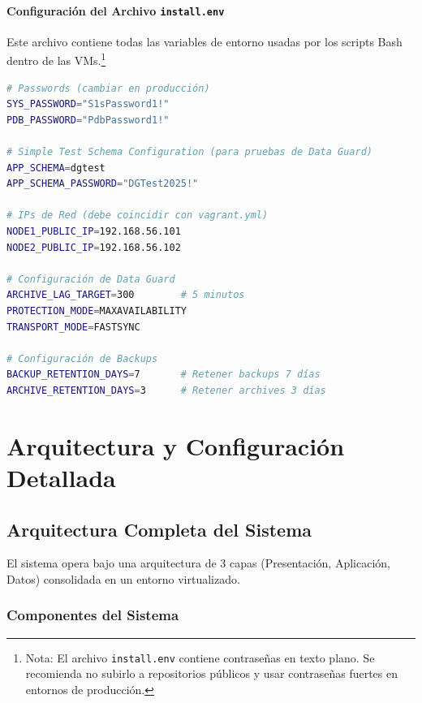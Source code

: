\documentclass[11pt, a4paper]{report}
\begin{document}
\subsubsection{Configuración del Archivo \texttt{install.env}}

Este archivo contiene todas las variables de entorno usadas por los scripts Bash dentro de las VMs.\footnote{Nota: El archivo \texttt{install.env} contiene contraseñas en texto plano. Se recomienda no subirlo a repositorios públicos y usar contraseñas fuertes en entornos de producción.}
\begin{lstlisting}[language=bash, caption={Valores de configuración en install.env}]
# Passwords (cambiar en producción)
SYS_PASSWORD="S1sPassword1!"
PDB_PASSWORD="PdbPassword1!"

# Simple Test Schema Configuration (para pruebas de Data Guard)
APP_SCHEMA=dgtest
APP_SCHEMA_PASSWORD="DGTest2025!"

# IPs de Red (debe coincidir con vagrant.yml)
NODE1_PUBLIC_IP=192.168.56.101
NODE2_PUBLIC_IP=192.168.56.102

# Configuración de Data Guard
ARCHIVE_LAG_TARGET=300        # 5 minutos
PROTECTION_MODE=MAXAVAILABILITY
TRANSPORT_MODE=FASTSYNC

# Configuración de Backups
BACKUP_RETENTION_DAYS=7       # Retener backups 7 días
ARCHIVE_RETENTION_DAYS=3      # Retener archives 3 días
\end{lstlisting}

\chapter{Arquitectura y Configuración Detallada}

\section{Arquitectura Completa del Sistema}

El sistema opera bajo una arquitectura de 3 capas (Presentación, Aplicación, Datos) consolidada en un entorno virtualizado.
\subsection{Componentes del Sistema}
\end{document}
